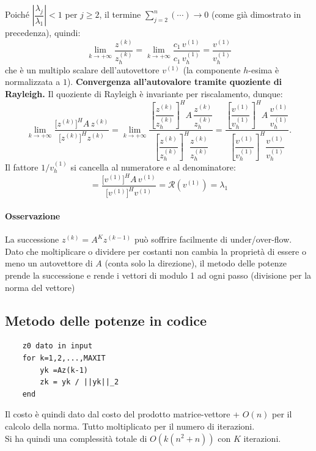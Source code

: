 \documentclass[12pt,a4paper,]{report}
\begin{document}
\begin{dimostrazione}
\[    \]
    Poiché $\left|\dfrac{\lambda_j}{\lambda_1}\right| < 1$ per $j \geq 2$,
    il termine $\displaystyle\sum_{j=2}^{n}(\cdots) \to 0$
    (come già dimostrato in precedenza), quindi:
    \[
        \lim_{k \to +\infty} \frac{z^{(k)}}{z_h^{(k)}}
        = \lim_{k \to +\infty} \frac{c_1\,v^{(1)}}{c_1\,v_h^{(1)}}
        = \frac{v^{(1)}}{v_h^{(1)}}
    \]
    che è un multiplo scalare dell'autovettore $v^{(1)}$
    (la componente $h$-esima è normalizzata a $1$).
    \medskip
    \textbf{Convergenza all'autovalore tramite quoziente di Rayleigh.}
    Il quoziente di Rayleigh è invariante per riscalamento, dunque:
    \[
        \lim_{k \to +\infty}
        \frac{\bigl[z^{(k)}\bigr]^{\!H} A\, z^{(k)}}
            {\bigl[z^{(k)}\bigr]^{\!H} z^{(k)}}
        = \lim_{k \to +\infty}
        \frac{
            \left[\dfrac{z^{(k)}}{z_h^{(k)}}\right]^{\!\!H}
            A\,
            \dfrac{z^{(k)}}{z_h^{(k)}}
        }{
            \left[\dfrac{z^{(k)}}{z_h^{(k)}}\right]^{\!\!H}
            \dfrac{z^{(k)}}{z_h^{(k)}}
        }
        =
        \frac{
            \left[\dfrac{v^{(1)}}{v_h^{(1)}}\right]^{\!\!H}
            A\,
            \dfrac{v^{(1)}}{v_h^{(1)}}
        }{
            \left[\dfrac{v^{(1)}}{v_h^{(1)}}\right]^{\!\!H}
            \dfrac{v^{(1)}}{v_h^{(1)}}
        }.
    \]
    Il fattore $1/v_h^{(1)}$ si cancella al numeratore e al denominatore:
    \[
        = \frac{\bigl[v^{(1)}\bigr]^{\!H} A\, v^{(1)}}
            {\bigl[v^{(1)}\bigr]^{\!H} v^{(1)}}
        = \mathcal{R}\!\left(v^{(1)}\right)
        = \lambda_1
    \]
\end{dimostrazione}
\paragraph{Osservazione}
La successione $z^{(k)} = A^Kz^{(k-1)}$ può soffrire facilmente di under/over-flow.\\
Dato che moltiplicare o dividere per costanti non cambia la proprietà di essere o meno un autovettore di $A$ (conta solo la direzione), il metodo delle potenze prende la successione e rende i vettori di modulo 1 ad ogni passo (divisione per la norma del vettore)

\subsection{Metodo delle potenze in codice}
\begin{lstlisting}
    z0 dato in input
    for k=1,2,...,MAXIT
        yk =Az(k-1)
        zk = yk / ||yk||_2
    end
\end{lstlisting}
Il costo è quindi dato dal costo del prodotto matrice-vettore + $O(n)$ per il calcolo della norma. Tutto moltiplicato per il numero di iterazioni.\\
Si ha quindi una complessità totale di $O(k(n^2+n))$ con $K$ iterazioni.
\end{document}
